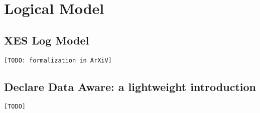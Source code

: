\section{Logical Model}
\subsection{XES Log Model}
\texttt{[TODO: formalization in ArXiV]}

\subsection{Declare Data Aware: a lightweight introduction}\label{sec:DAD}
\texttt{\color{red}[TODO]}
